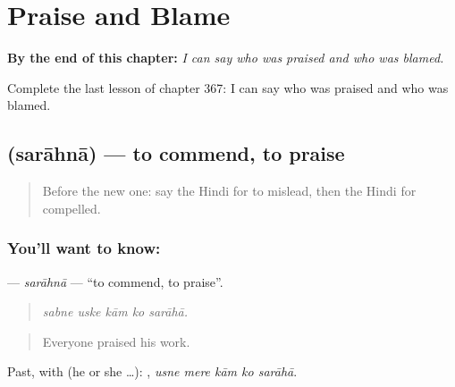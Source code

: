 
\chapter{Praise and Blame}
\label{ch:hi-praise-and-blame}

\begin{chapteropening}
\textbf{By the end of this chapter:} \emph{I can say who was praised and who was blamed.}

Complete the last lesson of chapter 367: I can say who was praised and who was blamed.
\end{chapteropening}

\section[\texorpdfstring{\hi{सराहना} (sarāhnā)}{सराहना (sarāhnā)}]{ (sarāhnā) — to commend, to praise}

\label{lesson:HI-C367-sarahna}



\begin{quote}
Before the new one: say the Hindi for to mislead, then the Hindi for compelled.
\end{quote}

\subsection*{You'll want to know: }
\textbf{} — \emph{sarāhnā} — \textquotedblleft{}to commend, to praise\textquotedblright{}.

\begin{quote}
    
\end{quote}

\begin{quote}
\emph{sabne uske kām ko sarāhā.}
\end{quote}

\begin{quote}
Everyone praised his work.
\end{quote}

Past, with  (he or she …):     , \emph{usne mere kām ko sarāhā}.

